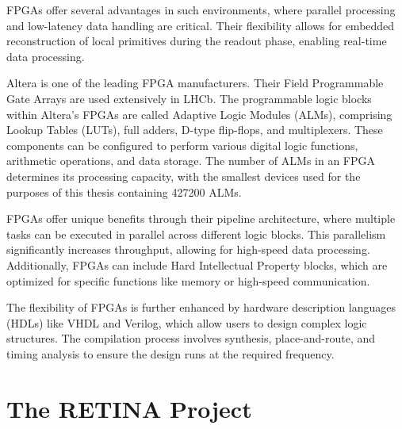 FPGAs offer several advantages in such environments, where parallel processing and low-latency data handling are critical. Their flexibility allows for embedded reconstruction of local primitives during the readout phase, enabling real-time data processing.

Altera is one of the leading FPGA manufacturers. Their Field Programmable Gate Arrays are used extensively in LHCb. The programmable logic blocks within Altera's FPGAs are called Adaptive Logic Modules (ALMs), comprising Lookup Tables (LUTs), full adders, D-type flip-flops, and multiplexers. These components can be configured to perform various digital logic functions, arithmetic operations, and data storage. The number of ALMs in an FPGA determines its processing capacity, with the smallest devices used for the purposes of this thesis containing 427200 ALMs.

FPGAs offer unique benefits through their pipeline architecture, where multiple tasks can be executed in parallel across different logic blocks. This parallelism significantly increases throughput, allowing for high-speed data processing. Additionally, FPGAs can include Hard Intellectual Property blocks, which are optimized for specific functions like memory or high-speed communication.

The flexibility of FPGAs is further enhanced by hardware description languages (HDLs) like VHDL and Verilog, which allow users to design complex logic structures. The compilation process involves synthesis, place-and-route, and timing analysis to ensure the design runs at the required frequency.

\section{The RETINA Project}

